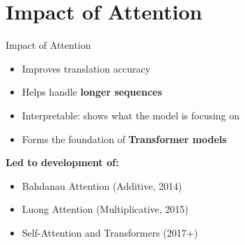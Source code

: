 \section{Impact of Attention}
\begin{frame}{Impact of Attention}
  \begin{itemize}
    \item Improves translation accuracy
    \item Helps handle \textbf{longer sequences}
    \item Interpretable: shows what the model is focusing on
    \item Forms the foundation of \textbf{Transformer models}
  \end{itemize}
  \vspace{1em}
  \textbf{Led to development of:}
  \begin{itemize}
    \item[$\blacktriangleright$] Bahdanau Attention (Additive, 2014)
    \item[$\blacktriangleright$] Luong Attention (Multiplicative, 2015)
    \item[$\blacktriangleright$] Self-Attention and Transformers (2017+)
  \end{itemize}
\end{frame}